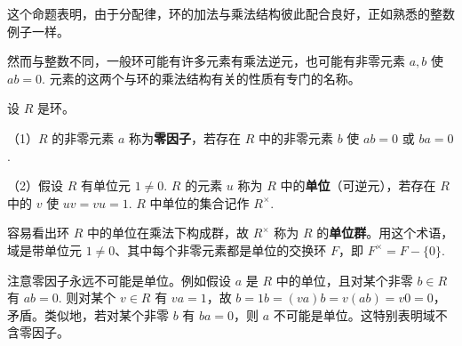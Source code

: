 这个命题表明，由于分配律，环的加法与乘法结构彼此配合良好，正如熟悉的整数例子一样。

然而与整数不同，一般环可能有许多元素有乘法逆元，也可能有非零元素 \(a, b\) 使 \(ab = 0\). 元素的这两个与环的乘法结构有关的性质有专门的名称。

\begin{definition}
设 \(R\) 是环。

（1）\(R\) 的非零元素 \(a\) 称为\textbf{零因子}，若存在 \(R\) 中的非零元素 \(b\) 使 \(ab = 0\) 或 \(ba = 0\).

（2）假设 \(R\) 有单位元 \(1 \neq 0\). \(R\) 的元素 \(u\) 称为 \(R\) 中的\textbf{单位}（可逆元），若存在 \(R\) 中的 \(v\) 使 \(uv = vu = 1\). \(R\) 中单位的集合记作 \(R^\times\).
\end{definition}

容易看出环 \(R\) 中的单位在乘法下构成群，故 \(R^\times\) 称为 \(R\) 的\textbf{单位群}。用这个术语，域是带单位元 \(1 \neq 0\)、其中每个非零元素都是单位的交换环 \(F\)，即 \(F^\times = F - \{0\}\).

注意零因子永远不可能是单位。例如假设 \(a\) 是 \(R\) 中的单位，且对某个非零 \(b \in R\) 有 \(ab = 0\). 则对某个 \(v \in R\) 有 \(va = 1\)，故 \(b = 1b = (va)b = v(ab) = v0 = 0\)，矛盾。类似地，若对某个非零 \(b\) 有 \(ba = 0\)，则 \(a\) 不可能是单位。这特别表明域不含零因子。

